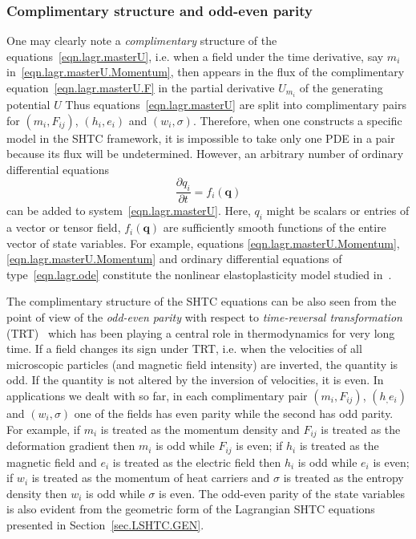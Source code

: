 \documentclass[twoside]{article}
\newcommand{\qq}{{\boldsymbol{q}}}
\newcommand{\pd}{\partial}
\begin{document}
\subsubsection{Complimentary structure and odd-even 
parity}\label{sec.compl.parity}

One may clearly note a \textit{complimentary} structure of the 
equations~\eqref{eqn.lagr.masterU}, i.e. when a field under the time 
derivative, say $ m_i $ in~\eqref{eqn.lagr.masterU.Momentum}, then appears in 
the flux of the complimentary equation~\eqref{eqn.lagr.masterU.F}
in the partial derivative $ U_{m_i} $ of the generating potential $ U 
$
Thus 
equations~\eqref{eqn.lagr.masterU} are split into complimentary pairs for $ 
(m_i,F_{ij}) $, $ (h_i,e_i) $ and $ (w_i,\sigma) $.
Therefore, when one constructs a specific model in the SHTC framework, it is 
impossible to take only one PDE in a pair because its flux will be 
undetermined.
However, an arbitrary number of ordinary differential equations
\begin{equation}\label{eqn.lagr.ode}
\frac{\pd q_i}{\pd t} = f_i(\qq)
\end{equation}
can be added to system~\eqref{eqn.lagr.masterU}. Here, $ q_i $ might be 
scalars 
or entries of a vector or tensor field, $ f_i(\qq) $ are sufficiently smooth 
functions of the entire vector of state variables. For example, equations 
\eqref{eqn.lagr.masterU.Momentum}, 
\eqref{eqn.lagr.masterU.Momentum} and ordinary differential equations of 
type~\eqref{eqn.lagr.ode} constitute the nonlinear elastoplasticity model 
studied in~\cite{GodPesh2010}.



The complimentary structure of the SHTC  equations can be also seen from the 
point of view of the \textit{odd-even parity} with respect to 
\textit{time-reversal 
transformation} (TRT)~\cite{Ottinger-book,Pavelka2014a} which has been playing 
a central role in thermodynamics for very long time. If a field changes its 
sign under TRT, i.e. when the velocities of all microscopic particles (and 
magnetic field intensity) are 
inverted, the quantity is odd. If the quantity is not altered by the inversion 
of velocities, it is even. In applications we dealt with so far, in each 
complimentary pair $ (m_i,F_{ij}) $, $ (h_,e_i) $ and $ (w_i,\sigma) $ one of 
the fields has even parity while the second has odd parity. For example, if $ 
m_i $ is treated as the momentum density and $ F_{ij} $ is treated as the 
deformation gradient then $ m_i $ is odd while $ F_{ij} $ is even; if $ h_i $ 
is treated as the magnetic field and $ e_i $ is treated as the electric field 
then $ h_i $ is odd while $ e_i $ is even; if $ w_i $ is treated as the 
momentum of heat carriers and $ \sigma $ is treated as the entropy density then 
$ w_i $ is odd while $ \sigma $ is even. The odd-even parity of the state 
variables is also evident from the geometric form of the Lagrangian SHTC 
equations presented in Section~\ref{sec.LSHTC.GEN}.
\end{document}
